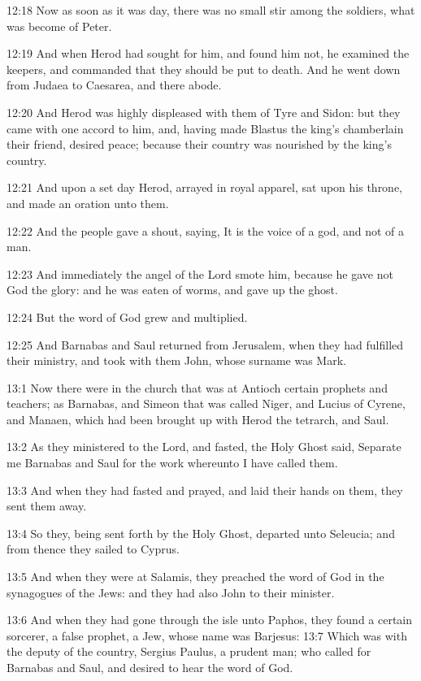 12:18 Now as soon as it was day, there was no small stir among the
soldiers, what was become of Peter.

12:19 And when Herod had sought for him, and found him not, he
examined the keepers, and commanded that they should be put to death.
And he went down from Judaea to Caesarea, and there abode.

12:20 And Herod was highly displeased with them of Tyre and Sidon: but
they came with one accord to him, and, having made Blastus the king's
chamberlain their friend, desired peace; because their country was
nourished by the king's country.

12:21 And upon a set day Herod, arrayed in royal apparel, sat upon his
throne, and made an oration unto them.

12:22 And the people gave a shout, saying, It is the voice of a god,
and not of a man.

12:23 And immediately the angel of the Lord smote him, because he gave
not God the glory: and he was eaten of worms, and gave up the ghost.

12:24 But the word of God grew and multiplied.

12:25 And Barnabas and Saul returned from Jerusalem, when they had
fulfilled their ministry, and took with them John, whose surname was
Mark.

13:1 Now there were in the church that was at Antioch certain prophets
and teachers; as Barnabas, and Simeon that was called Niger, and
Lucius of Cyrene, and Manaen, which had been brought up with Herod the
tetrarch, and Saul.

13:2 As they ministered to the Lord, and fasted, the Holy Ghost said,
Separate me Barnabas and Saul for the work whereunto I have called
them.

13:3 And when they had fasted and prayed, and laid their hands on
them, they sent them away.

13:4 So they, being sent forth by the Holy Ghost, departed unto
Seleucia; and from thence they sailed to Cyprus.

13:5 And when they were at Salamis, they preached the word of God in
the synagogues of the Jews: and they had also John to their minister.

13:6 And when they had gone through the isle unto Paphos, they found a
certain sorcerer, a false prophet, a Jew, whose name was Barjesus:
13:7 Which was with the deputy of the country, Sergius Paulus, a
prudent man; who called for Barnabas and Saul, and desired to hear the
word of God.

